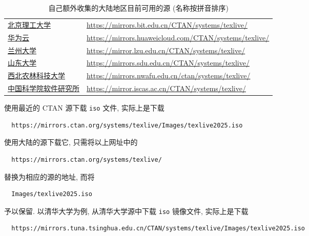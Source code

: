 \begin{table}
  \centering
  \caption{自己额外收集的大陆地区目前可用的源 (名称按拼音排序)}\label{tab:appendix:mirror-addition}
  \begin{tabular}{*{2}{l}}
    \hline\hline
    \href{https://mirrors.bit.edu.cn/web/}{北京理工大学}
    & \url{https://mirrors.bit.edu.cn/CTAN/systems/texlive/}\\
    \href{https://mirrors.huaweicloud.com/}{华为云}
    & \url{https://mirrors.huaweicloud.com/CTAN/systems/texlive/}\\
    \href{https://mirror.lzu.edu.cn/}{兰州大学}
    & \url{https://mirror.lzu.edu.cn/CTAN/systems/texlive/}\\
    \href{https://mirrors.sdu.edu.cn/}{山东大学}
    & \url{https://mirrors.sdu.edu.cn/CTAN/systems/texlive/}\\
    \href{https://mirrors.nwafu.edu.cn/}{西北农林科技大学}
    & \url{https://mirrors.nwafu.edu.cn/ctan/systems/texlive/}\\
    \href{https://mirror.iscas.ac.cn/}{中国科学院软件研究所}
    & \url{https://mirror.iscas.ac.cn/CTAN/systems/texlive/}\\
    \hline\hline
  \end{tabular}
\end{table}

使用最近的 CTAN 源下载 \texttt{iso} 文件,
实际上是下载
\begin{lstlisting}
  https://mirrors.ctan.org/systems/texlive/Images/texlive2025.iso
\end{lstlisting}
使用大陆的源下载它,
只需将以上网址中的
\begin{lstlisting}
  https://mirrors.ctan.org/systems/texlive/
\end{lstlisting}
替换为相应的源的地址,
而将
\begin{lstlisting}
  Images/texlive2025.iso
\end{lstlisting}
予以保留.
以清华大学为例,
从清华大学源中下载 \texttt{iso} 镜像文件,
实际上是下载
\begin{lstlisting}
  https://mirrors.tuna.tsinghua.edu.cn/CTAN/systems/texlive/Images/texlive2025.iso
\end{lstlisting}

